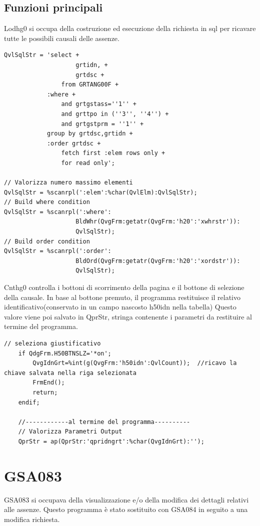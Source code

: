 \documentclass[target=bach,aauheader=,style=]{thud}
\begin{document}
\subsection{Funzioni principali}
Lodhg0 si occupa della costruzione ed esecuzione della richiesta in sql per ricavare tutte le possibili causali delle assenze.
\begin{lstlisting}[language=RPG, caption=Codice RPG di controllo dei pulsanti]
 QvlSqlStr = 'select +
                    grtidn, +
                    grtdsc +
                from GRTANG00F +
            :where +
                and grtgstass=''1'' +
                and grttpo in (''3'', ''4'') +
                and grtgstprm = ''1'' +
            group by grtdsc,grtidn +
            :order grtdsc +
                fetch first :elem rows only +
                for read only';

// Valorizza numero massimo elementi
QvlSqlStr = %scanrpl(':elem':%char(QvlElm):QvlSqlStr);
// Build where condition
QvlSqlStr = %scanrpl(':where':
                    BldWhr(QvgFrm:getatr(QvgFrm:'h20':'xwhrstr')):
                    QvlSqlStr);
// Build order condition
QvlSqlStr = %scanrpl(':order':
                    BldOrd(QvgFrm:getatr(QvgFrm:'h20':'xordstr')):
                    QvlSqlStr);
\end{lstlisting}

Cnthg0 controlla i bottoni di scorrimento della pagina e il bottone di selezione della causale.
In base al bottone premuto, il programma restituisce il relativo identificativo(conservato in un campo nascosto h50idn nella tabella)
Questo valore viene poi salvato in QprStr, stringa contenente i parametri da restituire al termine del programma.
\begin{lstlisting}[language=RPG, caption=Codice RPG di controllo dei pulsanti]
// seleziona giustificativo
    if QdgFrm.H50BTNSLZ='*on';
        QvgIdnGrt=%int(g(QvgFrm:'h50idn':QvlCount));  //ricavo la chiave salvata nella riga selezionata
        FrmEnd();
        return;
    endif;

    //------------al termine del programma----------
    // Valorizza Parametri Output
    QprStr = ap(QprStr:'qpridngrt':%char(QvgIdnGrt):'');
\end{lstlisting}
\break

\section{GSA083}
GSA083 si occupava della visualizzazione e/o della modifica dei dettagli relativi alle assenze.
Questo programma è stato sostituito con GSA084 in seguito a una modifica richiesta.
\end{document}
